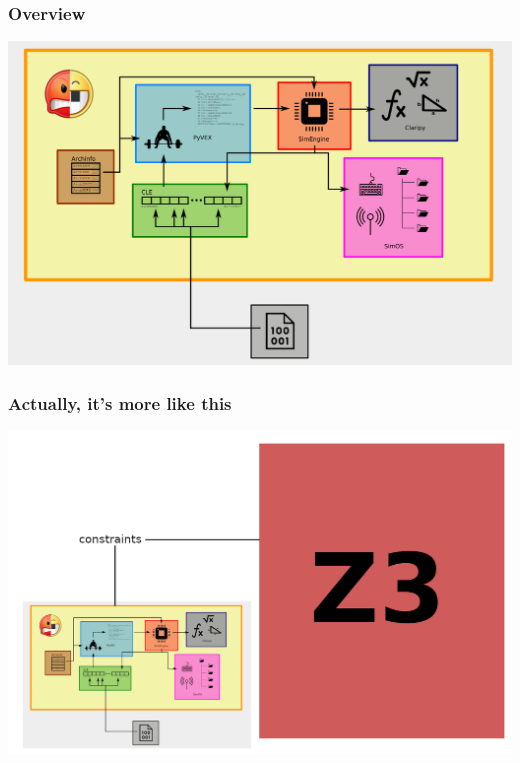 \documentclass[aspectratio=169]{beamer}
\begin{document}
\begin{frame}[fragile]
	\frametitle{Overview}
	\begin{center}
	\includegraphics[scale=0.25]{angr_overview.png}
	\end{center}
\end{frame}


\begin{frame}[fragile]
	\frametitle{Actually, it's more like this}
	\begin{center}
		\includegraphics[scale=0.25]{true_overview.png}
	\end{center}
\end{frame}
\end{document}
